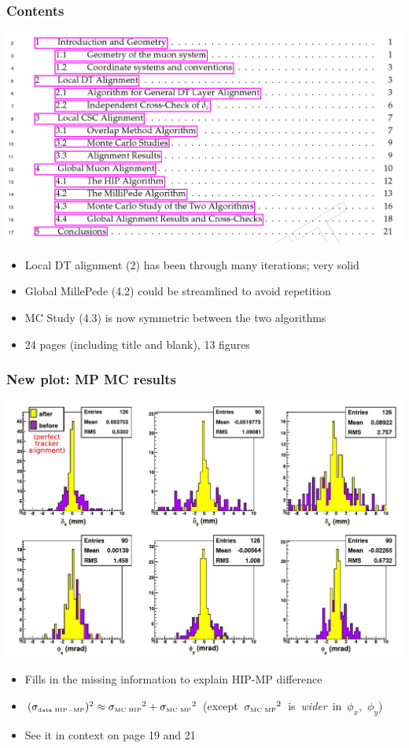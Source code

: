 \documentclass[compress]{beamer}
\begin{document}
\begin{frame}
\frametitle{Contents}

\includegraphics[width=\linewidth]{contents.png}

\begin{itemize}
\item Local DT alignment (2) has been through many iterations; very solid
\item Global MillePede (4.2) could be streamlined to avoid repetition
\item MC Study (4.3) is now symmetric between the two algorithms
\item 24 pages (including title and blank), 13 figures
\end{itemize}
\end{frame}

\begin{frame}
\frametitle{New plot: MP MC results}

\includegraphics[width=0.9\linewidth]{Millipede_MC_RandomScenario.pdf}

\begin{itemize}
\item Fills in the missing information to explain HIP-MP difference
\item $(\sigma_{\mbox{\tiny data HIP$-$MP}})^2 \approx {\sigma_{\mbox{\tiny MC HIP}}}^2 + {\sigma_{\mbox{\tiny MC MP}}}^2$ \mbox{(except ${\sigma_{\mbox{\tiny MC MP}}}^2$ is {\it wider} in $\phi_x$, $\phi_y$)\hspace{-1 cm}}
\item See it in context on page 19 and 21
\end{itemize}
\end{frame}
\end{document}
